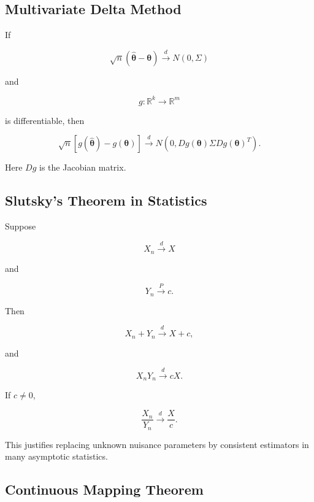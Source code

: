 \subsection{Multivariate Delta Method}
\label{subsec:multivariate-delta-method-mathstat}

If

\[
\sqrt{n}
(
\widehat{\boldsymbol{\theta}}
-
\boldsymbol{\theta}
)
\xrightarrow{d}
N
(
0,\Sigma
)
\]

and

\[
g:\mathbb{R}^k\to\mathbb{R}^m
\]

is differentiable, then

\[
\boxed{
\sqrt{n}
[
g(\widehat{\boldsymbol{\theta}})
-
g(\boldsymbol{\theta})
]
\xrightarrow{d}
N
\left(
0,
Dg(\boldsymbol{\theta})
\Sigma
Dg(\boldsymbol{\theta})^T
\right).
}
\]

Here \(Dg\) is the Jacobian matrix.

\subsection{Slutsky's Theorem in Statistics}
\label{subsec:slutsky-statistics}

Suppose

\[
X_n
\xrightarrow{d}
X
\]

and

\[
Y_n
\xrightarrow{P}
c.
\]

Then

\[
\boxed{
X_n+Y_n
\xrightarrow{d}
X+c,
}
\]

and

\[
\boxed{
X_nY_n
\xrightarrow{d}
cX.
}
\]

If \(c\neq0\),

\[
\boxed{
\frac{X_n}{Y_n}
\xrightarrow{d}
\frac{X}{c}.
}
\]

This justifies replacing unknown nuisance parameters by consistent
estimators in many asymptotic statistics.

\subsection{Continuous Mapping Theorem}
\label{subsec:continuous-mapping-statistics}

